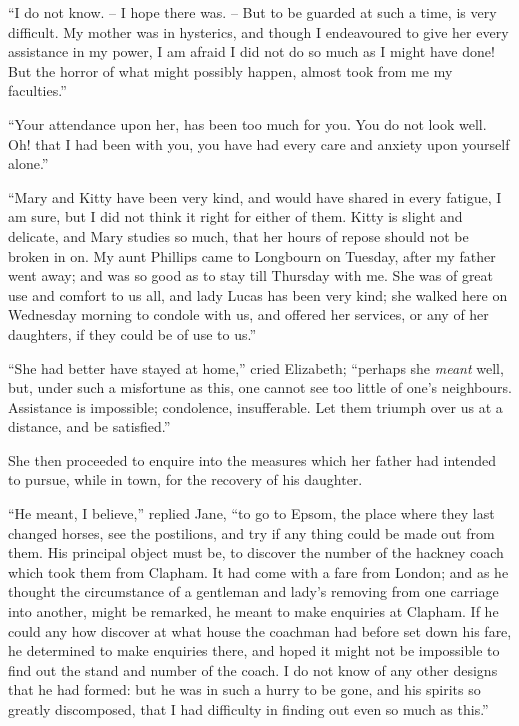 “I do not know. -- I hope there was. -- But to be guarded
at such a time, is very difficult. My mother was in
hysterics, and though I endeavoured to give her every
assistance in my power, I am afraid I did not do so much
as I might have done! But the horror of what might
possibly happen, almost took from me my faculties.”

“Your attendance upon her, has been too much for
you. You do not look well. Oh! that I had been with
you, you have had every care and anxiety upon yourself
alone.”

“Mary and Kitty have been very kind, and would
have shared in every fatigue, I am sure, but I did not
think it right for either of them. Kitty is slight and
delicate, and Mary studies so much, that her hours of
repose should not be broken in on. My aunt Phillips
came to Longbourn on Tuesday, after my father went
away; and was so good as to stay till Thursday with me.
She was of great use and comfort to us all, and lady
Lucas has been very kind; she walked here on Wednesday
morning to condole with us, and offered her services,
or any of her daughters, if they could be of use to us.”

“She had better have stayed at home,” cried Elizabeth;
“perhaps she \textit{meant} well, but, under such a misfortune
as this, one cannot see too little of one’s neighbours.
Assistance is impossible; condolence, insufferable. Let
them triumph over us at a distance, and be satisfied.”

She then proceeded to enquire into the measures which
her father had intended to pursue, while in town, for
the recovery of his daughter.

“He meant, I believe,” replied Jane, “to go to Epsom,
the place where they last changed horses, see the postilions,
and try if any thing could be made out from them. His
principal object must be, to discover the number of the
hackney coach which took them from Clapham. It had
come with a fare from London; and as he thought the
circumstance of a gentleman and lady’s removing from
one carriage into another, might be remarked, he meant
to make enquiries at Clapham. If he could any how discover
at what house the coachman had before set down
his fare, he determined to make enquiries there, and hoped
it might not be impossible to find out the stand and number
of the coach. I do not know of any other designs that
he had formed: but he was in such a hurry to be gone,
and his spirits so greatly discomposed, that I had difficulty
in finding out even so much as this.”

